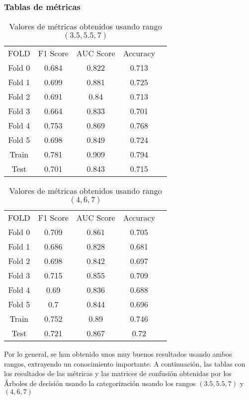 \subsubsection*{Tablas de métricas}
\begin{table}[H]
	\centering
	\begin{tabular}{|c|c|c|c|c}
		\cline{1-4}
		FOLD   & F1 Score & AUC Score & Accuracy \\ \cline{1-4}
		Fold 0 & 0.684    & 0.822     & 0.713    \\ \cline{1-4}
		Fold 1 & 0.699    & 0.881     & 0.725    \\ \cline{1-4}
		Fold 2 & 0.691    & 0.84      & 0.713    \\ \cline{1-4}
		Fold 3 & 0.664    & 0.833     & 0.701    \\ \cline{1-4}
		Fold 4 & 0.753    & 0.869     & 0.768    \\ \cline{1-4}
		Fold 5 & 0.698    & 0.849     & 0.724    \\ \cline{1-4}
		Train  & 0.781    & 0.909     & 0.794    \\ \cline{1-4}
		Test   & 0.701    & 0.843     & 0.715    \\ \cline{1-4}
	\end{tabular}
	\caption{Valores de métricas obtenidos usando rango $(3.5,5.5,7)$}
\end{table}
\begin{table}[H]
	\centering
	\begin{tabular}{|c|c|c|c|c}
		\cline{1-4}
		FOLD   & F1 Score & AUC Score & Accuracy \\ \cline{1-4}
		Fold 0 & 0.709    & 0.861     & 0.705    \\ \cline{1-4}
		Fold 1 & 0.686    & 0.828     & 0.681    \\ \cline{1-4}
		Fold 2 & 0.698    & 0.842     & 0.697    \\ \cline{1-4}
		Fold 3 & 0.715    & 0.855     & 0.709    \\ \cline{1-4}
		Fold 4 & 0.69     & 0.836     & 0.688    \\ \cline{1-4}
		Fold 5 & 0.7      & 0.844     & 0.696    \\ \cline{1-4}
		Train  & 0.752    & 0.89      & 0.746    \\ \cline{1-4}
		Test   & 0.721    & 0.867     & 0.72     \\ \cline{1-4}
	\end{tabular}
	\caption{Valores de métricas obtenidos usando rango $(4,6,7)$}
\end{table}
Por lo general, se han obtenido unos muy buenos resultados usando ambos rangos, extrayendo un conocimiento importante.
\clearpage
A continuación, las tablas con los resultados de las métricas y las matrices de confusión obtenidas por los Árboles de decisión usando la categorización usando los rangos $(3.5,5.5,7)$ y $(4,6,7)$
